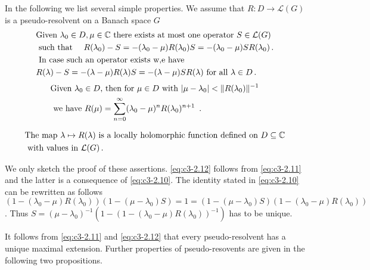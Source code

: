 In the following we list several simple properties.
We assume that $R \colon D \to \mathcal{L}(G)$ is a pseudo-resolvent on a Banach space $G$
\begin{equation}\label{eq:c3-2.10}
	\begin{aligned}
	&\text{Given  $\lambda_{0} \in D, \mu \in \mathbb{C} $  there exists at most one operator  $S \in \mathcal{L}(G)$ }\\
	&\text{ such that \quad $R(\lambda_{0}) - S = -(\lambda_{0}-\mu)R(\lambda_{0})S = -(\lambda_{0}-\mu)SR(\lambda_{0})$}\,.\\
	&\text{ In case such an operator exists w,e have} \\
	&\text{$R(\lambda) - S = -(\lambda-\mu)R(\lambda)S = -(\lambda-\mu)SR(\lambda)$ for all $\lambda \in D$}\,.
	\end{aligned}
\end{equation}
%
\begin{equation}\label{eq:c3-2.11}
	\begin{aligned}
	&\text{Given  $\lambda_{0} \in D$,  then for  $\mu \in D$  with  $|\mu-\lambda_{0}| < \|R(\lambda_{0})\|^{-1}$}\\ 
	&\text{ we have $ R(\mu) = \sum_{n=0}^{\infty} (\lambda_{0}-\mu)^n R(\lambda_{0})^{n+1}$ }\,.
	\end{aligned}
\end{equation}

\begin{equation}\label{eq:c3-2.12}
	\begin{aligned}
	&\text{The map $\lambda \mapsto R(\lambda)$ is a locally holomorphic function defined on  $D \subseteq \mathbb{C} $}\\ 
	&\text{ with values in  $\mathcal{L}(G)$}\,.
	\end{aligned}
\end{equation}

We only sketch the proof of these assertions. \eqref{eq:c3-2.12} follows from \eqref{eq:c3-2.11} and the latter is a consequence of \eqref{eq:c3-2.10}.
The identity stated in \eqref{eq:c3-2.10} can be rewritten as follows 
$(1-(\lambda_{0}-\mu)R(\lambda_{0}))(1-(\mu-\lambda_{0})S) = 1 = (1-(\mu-\lambda_{0})S)(1-(\lambda_{0}-\mu)R(\lambda_{0}))$.
Thus $S = (\mu-\lambda_{0})^{-1}(1 - (1-(\lambda_{0}-\mu)R(\lambda_{0}))^{-1})$ has to be unique.

It follows from \eqref{eq:c3-2.11} and \eqref{eq:c3-2.12} that every pseudo-resolvent has a unique maximal extension.
Further properties of pseudo-resovents are given in the following two propositions.

